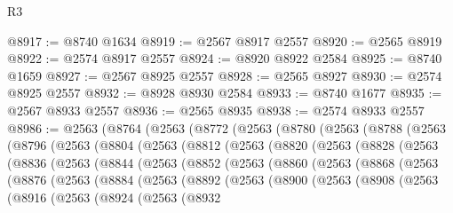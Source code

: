 \begin{lexlean}{R3}
\begin{coremodule}
@8917 := @8740 @1634
@8919 := @2567 @8917 @2557
@8920 := @2565 @8919
@8922 := @2574 @8917 @2557
@8924 := @8920 @8922 @2584
@8925 := @8740 @1659
@8927 := @2567 @8925 @2557
@8928 := @2565 @8927
@8930 := @2574 @8925 @2557
@8932 := @8928 @8930 @2584
@8933 := @8740 @1677
@8935 := @2567 @8933 @2557
@8936 := @2565 @8935
@8938 := @2574 @8933 @2557
@8986 := @2563
    (@8764
      (@2563
        (@8772
          (@2563
            (@8780
              (@2563
                (@8788
                  (@2563
                    (@8796
                      (@2563
                        (@8804
                          (@2563
                            (@8812
                              (@2563
                                (@8820
                                  (@2563
                                    (@8828
                                      (@2563
                                        (@8836
                                          (@2563
                                            (@8844
                                              (@2563
                                                (@8852
                                                  (@2563
                                                    (@8860
                                                      (@2563
                                                        (@8868
                                                          (@2563
                                                            (@8876
                                                              (@2563
                                                                (@8884
                                                                  (@2563
                                                                    (@8892
                                                                      (@2563
                                                                        (@8900
                                                                          (@2563
                                                                            (@8908
                                                                              (@2563
                                                                                (@8916
                                                                                  (@2563
                                                                                    (@8924
                                                                                      (@2563
                                                                                        (@8932

\end{coremodule}
\end{lexlean}
